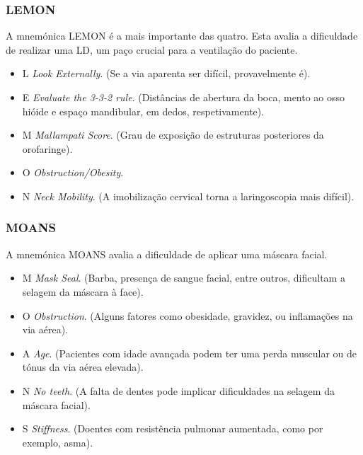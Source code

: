 \documentclass[a4paper,12pt,twoside]{article}
\begin{document}
    \subsubsection{LEMON}
    A mnemónica \gls{LEMON} é a mais importante das quatro. Esta avalia a dificuldade de realizar uma \gls{LD}, um paço crucial para a ventilação do paciente.
    \begin{itemize}
        \item L \textrightarrow \textit{ Look Externally}. (Se a via aparenta ser difícil, provavelmente é).
        \item E \textrightarrow \textit{ Evaluate the 3-3-2 rule}. (Distâncias de abertura da boca, mento ao osso hióide e espaço mandibular, em dedos, respetivamente).
        \item M \textrightarrow \textit{ Mallampati Score}. (Grau de exposição de estruturas posteriores da orofaringe).
        \item O \textrightarrow \textit{ Obstruction/Obesity}.
        \item N \textrightarrow \textit{ Neck Mobility}. (A imobilização cervical torna a laringoscopia mais difícil).
    \end{itemize}

    \subsubsection{MOANS}
    A mnemónica \gls{MOANS} avalia a dificuldade de aplicar uma máscara facial.
    \begin{itemize}
        \item M \textrightarrow \textit{ Mask Seal}. (Barba, presença de sangue facial, entre outros, dificultam a selagem da máscara à face).
        \item O \textrightarrow \textit{ Obstruction}. (Alguns fatores como obesidade, gravidez, ou inflamações na via aérea).
        \item A \textrightarrow \textit{ Age}. (Pacientes com idade avançada podem ter uma perda muscular ou de tónus da via aérea elevada).
        \item N \textrightarrow \textit{ No teeth}. (A falta de dentes pode implicar dificuldades na selagem da máscara facial).
        \item S \textrightarrow \textit{ Stiffness}. (Doentes com resistência pulmonar aumentada, como por exemplo, asma).
    \end{itemize}
\end{document}
